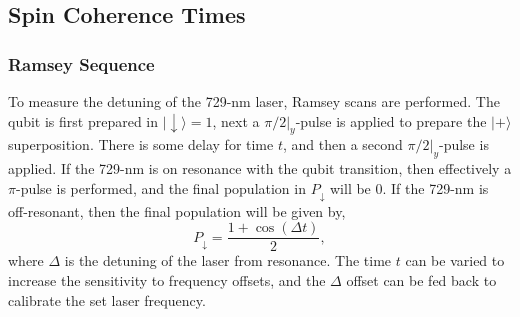 \subsection{Spin Coherence Times}
\label{sec:Coherence}
\subsubsection{Ramsey Sequence}
    To measure the detuning of the 729-nm laser, Ramsey scans are performed.
    The qubit is first prepared in $|\downarrow\rangle = 1$, next a $\pi/2|_y$-pulse is applied to prepare the $|+\rangle$ superposition. There is some delay for time $t$, and then a second
    $\pi/2|_y$-pulse is applied. If the 729-nm is on resonance with the qubit transition, then effectively a $\pi$-pulse is performed, and the final population in $P_\downarrow$ will be 0. If the 729-nm is off-resonant, then the final population will be given by,
    \begin{equation}
        P_{\downarrow} = \frac{1+\cos(\Delta t)}{2},
    \end{equation}
    where $\Delta$ is the detuning of the laser from resonance.
    The time $t$ can be varied to increase the sensitivity to frequency offsets, and the $\Delta$ offset can be fed back to calibrate the set laser frequency. \\

